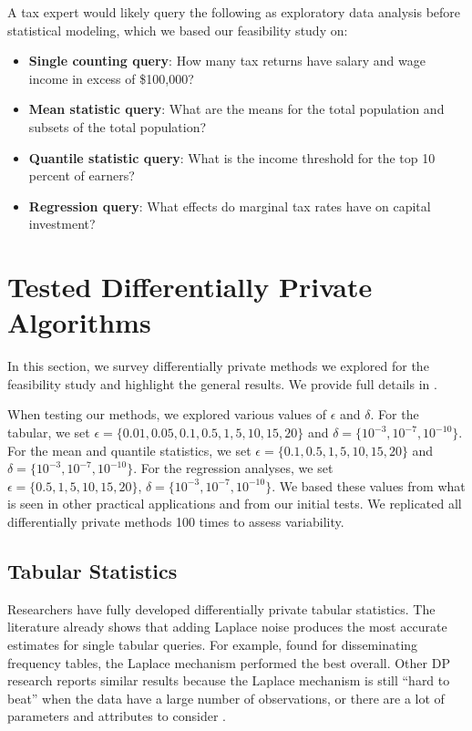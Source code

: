 A tax expert would likely query the following as exploratory data analysis before statistical modeling, which we based our feasibility study on:

\begin{itemize}
    \item \textbf{Single counting query}: How many tax returns have salary and wage income in excess of \$100,000?
    \item \textbf{Mean statistic query}: What are the means for the total population and subsets of the total population?
    \item \textbf{Quantile statistic query}: What is the income threshold for the top 10 percent of earners?
    \item \textbf{Regression query}: What effects do marginal tax rates have on capital investment?
\end{itemize}

\section{Tested Differentially Private Algorithms}\label{sec:dp-mech}
In this section, we survey differentially private methods we explored for the feasibility study and highlight the general results. We provide full details in \citet{barrientos2021}.

When testing our methods, we explored various values of $\epsilon$ and $\delta$. For the tabular, we set $\epsilon =\{0.01, 0.05, 0.1, 0.5, 1, 5, 10, 15, 20\}$ and $\delta=\{10^{-3},10^{-7},10^{-10}\}$. For the mean and quantile statistics, we set $\epsilon =\{0.1, 0.5, 1, 5, 10, 15, 20\}$ and $\delta=\{10^{-3},10^{-7},10^{-10}\}$. For the regression analyses, we set $\epsilon =\{0.5, 1, 5, 10, 15, 20\}$, $\delta=\{10^{-3},10^{-7},10^{-10}\}$. We based these values from what is seen in other practical applications and from our initial tests. We replicated all differentially private methods 100 times to assess variability.

\subsection{Tabular Statistics}
Researchers have fully developed differentially private tabular statistics. The literature already shows that adding Laplace noise produces the most accurate estimates for single tabular queries. For example, \citet{rinott2018confidentiality} found for disseminating frequency tables, the Laplace mechanism performed the best overall. Other DP research reports similar results because the Laplace mechanism is still ``hard to beat'' when the data have a large number of observations, or there are a lot of parameters and attributes to consider \citep{bowen2021differentially,shlomo2018statistical,liu2018generalized}.


